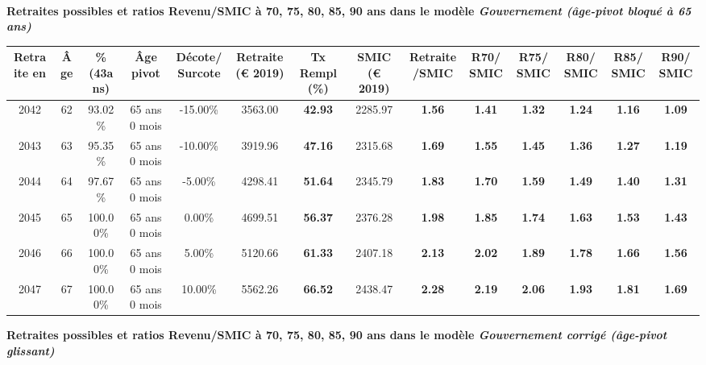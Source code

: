  ~\\{\bf \noindent Retraites possibles et ratios Revenu/SMIC à 70, 75, 80, 85, 90 ans dans le modèle \emph{Gouvernement (âge-pivot bloqué à 65 ans)}}  
 
\begin{adjustbox}{max width=\textwidth} 
\begin{tabular}[htb]{|c|c||c|c|c||c|c||c|c||c|c|c|c|c|} 
\hline 
 Retraite en &  Âge &  \%(43ans) &  Âge pivot &  Décote/Surcote &  Retraite (\euro{} 2019) &  Tx Rempl(\%) &  SMIC (\euro{} 2019) &  Retraite/SMIC &  R70/SMIC &  R75/SMIC &  R80/SMIC &  R85/SMIC &  R90/SMIC \\ 
\hline \hline 
 2042 &  62 &  93.02\% &  65 ans 0 mois &  -15.00\% &  3563.00 &  {\bf 42.93} &  2285.97 &  {\bf 1.56} &  {\bf 1.41} &  {\bf 1.32} &  {\bf 1.24} &  {\bf 1.16} &  {\bf 1.09} \\ 
\hline 
 2043 &  63 &  95.35\% &  65 ans 0 mois &  -10.00\% &  3919.96 &  {\bf 47.16} &  2315.68 &  {\bf 1.69} &  {\bf 1.55} &  {\bf 1.45} &  {\bf 1.36} &  {\bf 1.27} &  {\bf 1.19} \\ 
\hline 
 2044 &  64 &  97.67\% &  65 ans 0 mois &  -5.00\% &  4298.41 &  {\bf 51.64} &  2345.79 &  {\bf 1.83} &  {\bf 1.70} &  {\bf 1.59} &  {\bf 1.49} &  {\bf 1.40} &  {\bf 1.31} \\ 
\hline 
 2045 &  65 &  100.00\% &  65 ans 0 mois &  0.00\% &  4699.51 &  {\bf 56.37} &  2376.28 &  {\bf 1.98} &  {\bf 1.85} &  {\bf 1.74} &  {\bf 1.63} &  {\bf 1.53} &  {\bf 1.43} \\ 
\hline 
 2046 &  66 &  100.00\% &  65 ans 0 mois &  5.00\% &  5120.66 &  {\bf 61.33} &  2407.18 &  {\bf 2.13} &  {\bf 2.02} &  {\bf 1.89} &  {\bf 1.78} &  {\bf 1.66} &  {\bf 1.56} \\ 
\hline 
 2047 &  67 &  100.00\% &  65 ans 0 mois &  10.00\% &  5562.26 &  {\bf 66.52} &  2438.47 &  {\bf 2.28} &  {\bf 2.19} &  {\bf 2.06} &  {\bf 1.93} &  {\bf 1.81} &  {\bf 1.69} \\ 
\hline 
\hline 
\end{tabular} 
\end{adjustbox} 
 
 \vspace{0.1cm} 
{\bf \noindent Retraites possibles et ratios Revenu/SMIC à 70, 75, 80, 85, 90 ans dans le modèle \emph{Gouvernement corrigé (âge-pivot glissant)}}  
 
